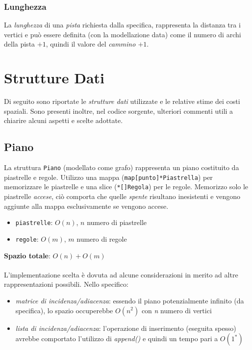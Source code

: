 \documentclass{article}
\begin{document}
\subsubsection*{Lunghezza}
La \textit{lunghezza} di una \textit{pista} richiesta dalla specifica, rappresenta la distanza tra i vertici e può essere definita (con la modellazione data) come il numero di archi della pista \(+ 1\), quindi il valore del \textit{cammino \(+ 1\)}.

\section{Strutture Dati}
Di seguito sono riportate le \textit{strutture dati} utilizzate e le relative stime dei costi spaziali.
Sono presenti inoltre, nel codice sorgente, ulteriori commenti utili a chiarire alcuni aspetti e scelte adottate.

\subsection*{Piano}
La struttura \texttt{Piano} (modellato come grafo) rappresenta un piano costituito da piastrelle e regole. Utilizzo una mappa (\texttt{map[punto]*Piastrella}) per memorizzare le piastrelle e una slice (\texttt{*[]Regola}) per le regole.
Memorizzo solo le piastrelle \textit{accese}, ciò comporta che quelle \textit{spente} risultano inesistenti e vengono aggiunte alla mappa esclusivamente se vengono accese.

\begin{itemize}
  \item \texttt{piastrelle}: \(O(n)\), \(n\) numero di piastrelle
  \item \texttt{regole}: \(O(m)\), \(m\) numero di regole
\end{itemize}
\textbf{Spazio totale}: \(O(n) + O(m)\)
\\ \\
L'implementazione scelta è dovuta ad alcune considerazioni in merito ad altre rappresentazioni possibili.
Nello specifico:
\begin{itemize}
  \item \textit{matrice di incidenza/adiacenza}: essendo il piano potenzialmente infinito (da specifica), lo spazio occuperebbe \(O(n^2)\) con \textit{n} numero di vertici
  \item \textit{lista di incidenza/adiacenza}: l'operazione di inserimento (eseguita spesso) avrebbe comportato l'utilizzo di \textit{append()} e quindi un tempo pari a \(O(1^*)\)
\end{itemize}
\end{document}
